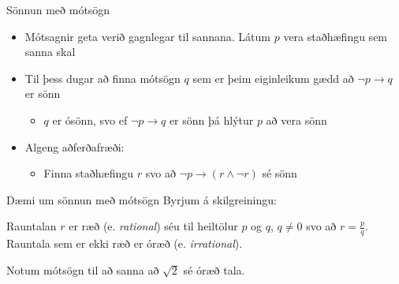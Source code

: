 \documentclass{beamer}
\begin{document}
\begin{frame}{Sönnun með mótsögn}
    \begin{itemize}
        \item Mótsagnir geta verið gagnlegar til sannana. Látum $p$ vera staðhæfingu sem sanna skal
        \item Til þess dugar að finna mótsögn $q$ sem er þeim eiginleikum gædd að $\lnot p \to q$ er sönn
        \begin{itemize}
            \item $q$ er ósönn, svo ef $\lnot p \to q$ er sönn þá hlýtur $p$ að vera sönn
        \end{itemize}
        \item Algeng aðferðafræði:
        \begin{itemize}
            \item Finna staðhæfingu $r$ svo að $\lnot p \to (r \land \lnot r)$ sé sönn
        \end{itemize}
    \end{itemize}
\end{frame}

\begin{frame}{Dæmi um sönnun með mótsögn}
    Byrjum á skilgreiningu:
    \begin{tcolorbox}[title=Ræðar og óræðar tölur]
        Rauntalan $r$ er ræð (e. \emph{rational}) séu til heiltölur $p$ og $q$, $q \neq 0$ svo að $r = \frac{p}{q}$. Rauntala sem er ekki ræð er óræð (e. \emph{irrational}).
    \end{tcolorbox}
    Notum mótsögn til að sanna að $\sqrt{2}$ sé óræð tala.
\end{frame}
\end{document}
